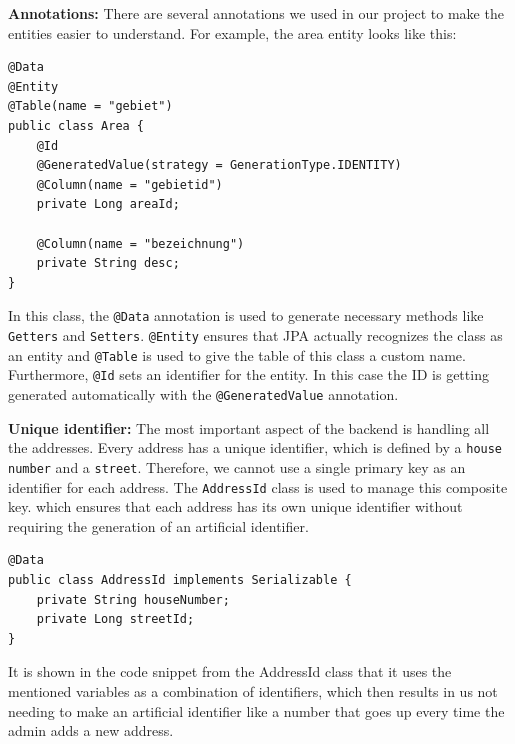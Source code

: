     \textbf{Annotations:} \newline
    There are several annotations we used in our project to make the entities easier to understand. For example, the area entity looks like this:  
    \begin{verbatim}
@Data
@Entity
@Table(name = "gebiet")
public class Area {
    @Id
    @GeneratedValue(strategy = GenerationType.IDENTITY)
    @Column(name = "gebietid")
    private Long areaId;
        
    @Column(name = "bezeichnung")
    private String desc;
}                  
    \end{verbatim} 

    In this class, the \texttt{@Data} annotation is used to generate necessary methods like \texttt{Getters} and \texttt{Setters}. \texttt{@Entity} ensures that JPA actually recognizes the class as an entity and \texttt{@Table} is used to give the table of this class a custom name. Furthermore, \texttt{@Id} sets an identifier for the entity. In this case the ID is getting generated automatically with the \texttt{@GeneratedValue} annotation. \newline
    
    \textbf{Unique identifier:} \newline
    The most important aspect of the backend is handling all the addresses. Every address has a unique identifier, which is defined by a \texttt{house number} and a \texttt{street}. Therefore, we cannot use a single primary key as an identifier for each address. \newline
    The \texttt{AddressId} class is used to manage this composite key. which ensures that each address has its own unique identifier without requiring the generation of an artificial identifier.
    \lstset{style=java, caption=AddressId}
    \begin{verbatim}
@Data
public class AddressId implements Serializable { 
    private String houseNumber;
    private Long streetId;
}                         
    \end{verbatim} 
    It is shown in the code snippet from the AddressId class that it uses the mentioned variables as a combination of identifiers, which then results in us not needing to make an artificial identifier like a number that goes up every time the admin adds a new address. \newline

